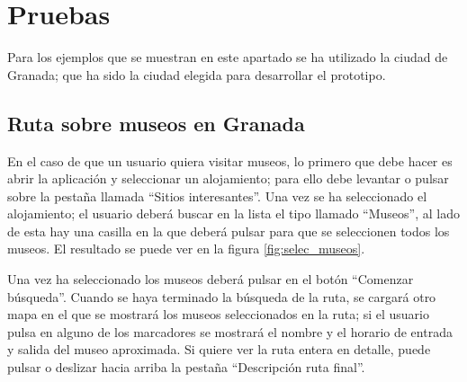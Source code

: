 \section{Pruebas}
Para los ejemplos que se muestran en este apartado se ha utilizado la ciudad de Granada; que ha sido la ciudad elegida para desarrollar el prototipo.

\subsection[Caso 1]{Ruta sobre museos en Granada}
En el caso de que un usuario quiera visitar museos, lo primero que debe hacer es abrir la aplicación y seleccionar un alojamiento; para ello debe levantar o pulsar sobre la pestaña llamada \enquote{Sitios interesantes}. Una vez se ha seleccionado el alojamiento; el usuario deberá buscar en la lista el tipo llamado \enquote{Museos}, al lado de esta hay una casilla en la que deberá pulsar para que se seleccionen todos los museos. El resultado se puede ver en la figura \ref{fig:selec_museos}.\newline

Una vez ha seleccionado los museos deberá pulsar en el botón \enquote{Comenzar búsqueda}. Cuando se haya terminado la búsqueda de la ruta, se cargará otro mapa en el que se mostrará los museos seleccionados en la ruta; si el usuario pulsa en alguno de los marcadores se mostrará el nombre y el horario de entrada y salida del museo aproximada. Si quiere ver la ruta entera en detalle, puede pulsar o deslizar hacia arriba la pestaña \enquote{Descripción ruta final}.\newline

